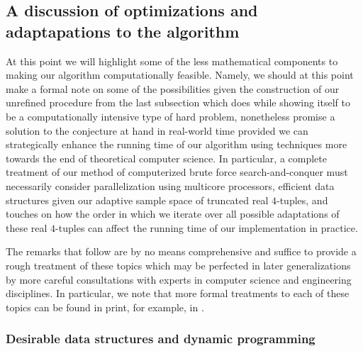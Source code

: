 \documentclass[12pt]{article}
\begin{document}
\subsection{A discussion of optimizations and adaptapations to the algorithm} 

At this point we will highlight some of the less mathematical components to making our algorithm 
computationally feasible. Namely, we should at this point make a formal note on some of the 
possibilities given the construction of our unrefined procedure from the last subsection which does 
while showing itself to be a computationally intensive type of hard problem, nonetheless promise a solution 
to the conjecture at hand in real-world time provided we can strategically enhance the running time of 
our algorithm using techniques more towards the end of theoretical computer science. 
In particular, a complete treatment of our method of computerized brute force search-and-conquer 
must necessarily consider parallelization using multicore processors, efficient data structures given 
our adaptive sample space of truncated real $4$-tuples, and touches on how the order in which we 
iterate over all possible adaptations of these real $4$-tuples can affect the running time of our 
implementation in practice. 

The remarks that follow are by no means comprehensive and suffice to 
provide a rough treatment of these topics which may be perfected in later generalizations by 
more careful consultations with experts in computer science and engineering disciplines. 
In particular, we note that more formal treatments to each of these topics can be found in print, 
for example, in \cite{PARALLEL-COMPREF,TANENBAUM-OS}. 

\subsubsection{Desirable data structures and dynamic programming} 
\end{document}
